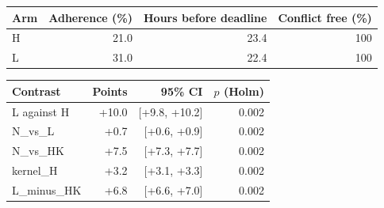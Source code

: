 \begin{tabular}{lrrr}
\hline
Arm & Adherence (\%) & Hours before deadline & Conflict free (\%) \\
\hline
H & 21.0 & 23.4 & 100 \\
L & 31.0 & 22.4 & 100 \\
\hline
\end{tabular}

\begin{tabular}{lrrr}
\hline
Contrast & Points & 95\% CI & $p$ (Holm) \\
\hline
L against H & +10.0 & [+9.8, +10.2] & 0.002 \\
N_vs_L & +0.7 & [+0.6, +0.9] & 0.002 \\
N_vs_HK & +7.5 & [+7.3, +7.7] & 0.002 \\
kernel_H & +3.2 & [+3.1, +3.3] & 0.002 \\
L_minus_HK & +6.8 & [+6.6, +7.0] & 0.002 \\
\hline
\end{tabular}
